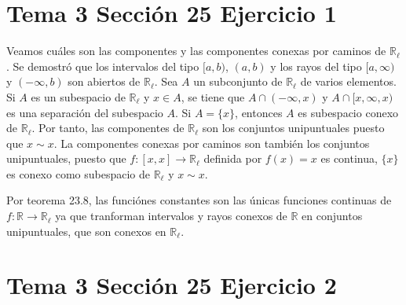 \documentclass{article}
\begin{document}
\section{Tema 3 Sección 25 Ejercicio 1}
Veamos cuáles son las componentes y las componentes conexas por caminos de $\mathbb{R}_\ell$. Se demostró que los intervalos del tipo $[a,b)$,  $(a,b)$ y los rayos del tipo $[a,\infty)$ y $(-\infty,b)$ son abiertos de $\mathbb{R}_\ell$. Sea $A$ un subconjunto de $\mathbb{R}_\ell$ de varios elementos. Si $A$ es un subespacio de $\mathbb{R}_\ell$ y $x\in A$, se tiene que $A\cap (-\infty,x)$ y  $A\cap [x,\infty,x)$ es una separación del subespacio $A$. Si $A=\{x\}$, entonces $A$ es subespacio conexo de $\mathbb{R}_\ell$. Por tanto, las componentes de $\mathbb{R}_\ell$ son los conjuntos unipuntuales puesto que $x\sim x$. La componentes conexas por caminos son también los conjuntos unipuntuales, puesto que $f:[x,x]\rightarrow\mathbb{R}_\ell$ definida por $f(x)=x$ es continua, $\{x\}$ es conexo como subespacio de $\mathbb{R}_\ell$ y $x\sim x$.

Por teorema 23.8, las funciónes constantes son las únicas funciones continuas de $f:\mathbb{R}\rightarrow\mathbb{R}_\ell$ ya que tranforman intervalos y rayos conexos de $\mathbb{R}$ en conjuntos unipuntuales, que son conexos en $\mathbb{R}_\ell$.

\section{Tema 3 Sección 25 Ejercicio 2}
\end{document}
